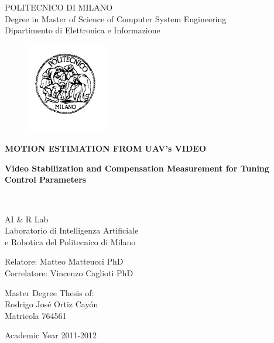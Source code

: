 \thispagestyle{empty}

\vspace*{-1.5cm} \bfseries{
\begin{center}
  \large
  POLITECNICO DI MILANO\\
  \normalsize
	Degree in Master of Science of Computer System Engineering\\
  Dipartimento di Elettronica e Informazione\\
  \begin{figure}[htbp]
    \begin{center}
      \includegraphics[width=3.5cm]{./pictures/logopm}
  	 \end{center}
  \end{figure}
  \vspace*{0.3cm} \LARGE
  
  \textbf{MOTION ESTIMATION FROM UAV's VIDEO}\\
  	\begin{Large}
	\textbf{Video Stabilization and Compensation Measurement for Tuning Control Parameters}
	\end{Large}\\
  \vspace*{.75truecm} \large
  
  AI \& R Lab \\
  Laboratorio di Intelligenza Artificiale \\
  e Robotica del Politecnico di Milano
\end{center}
\vspace*{3.0cm} \large

\begin{flushleft}
  Relatore: Matteo Matteucci PhD\\
  Correlatore: Vincenzo Caglioti PhD\\ 
\end{flushleft}
\vspace*{1.0cm}

\begin{flushright}
	Master	Degree Thesis of:\\ 
	Rodrigo Jos\'e Ortiz Cay\'on\\ 
	Matricola 764561\\ 
\end{flushright}
\vspace*{0.5cm}

\begin{center}
	Academic Year 2011-2012
\end{center} \clearpage
}